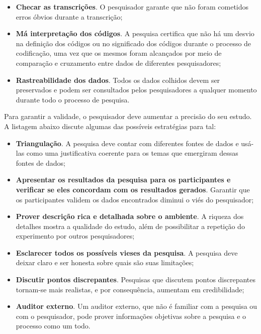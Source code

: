 \begin{itemize}
	\item \textbf{Checar as transcrições}. O pesquisador garante que não foram
	cometidos erros óbvios durante a transcrição;

	\item \textbf{Má interpretação dos códigos}. A pesquisa certifica que não há um
	desvio na definição dos códigos ou no significado dos códigos durante o processo 
	de codificação, uma vez que os mesmos foram alcançados por meio de comparação e
	cruzamento entre dados de diferentes pesquisadores;
	
	\item \textbf{Rastreabilidade dos dados}. Todos os dados colhidos devem ser
	preservados e podem ser consultados pelos pesquisadores a qualquer momento
	durante todo o processo de pesquisa.

\end{itemize}

Para garantir a validade, o pesquisador deve aumentar a precisão do seu estudo.
A listagem abaixo discute algumas das possíveis estratégias para tal:

\begin{itemize}
	\item \textbf{Triangulação}. A pesquisa deve contar com diferentes fontes
	de dados e usá-las como uma justificativa coerente para os temas que emergiram
	dessas fontes de dados;

	\item \textbf{Apresentar os resultados da pesquisa para os participantes e
	verificar se eles concordam com os resultados gerados}. Garantir que os
	participantes validem os dados encontrados diminui o viés do pesquisador;

	\item \textbf{Prover descrição rica e detalhada sobre o ambiente}. A riqueza
	dos detalhes mostra a qualidade do estudo, além de possibilitar a repetição do
	experimento por outros pesquisadores;

	\item \textbf{Esclarecer todos os possíveis vieses da pesquisa}. A pesquisa
	deve deixar claro e ser honesta sobre quais são suas limitações;
	
	\item \textbf{Discutir pontos discrepantes}. Pesquisas que discutem pontos
	discrepantes tornam-se mais realistas, e por consequência, aumentam em
	credibilidade;
	
	\item \textbf{Auditor externo}. Um auditor externo, que não é familiar com a
	pesquisa ou com o pesquisador, pode prover informações objetivas sobre a
	pesquisa e o processo como um todo.

\end{itemize} 
